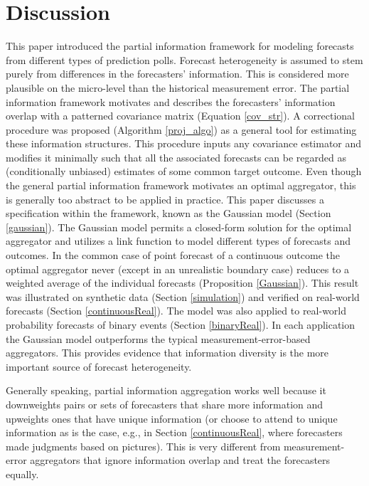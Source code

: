 \documentclass[11pt]{article}
\theoremstyle{definition}
\theoremstyle{definition}
\begin{document}
\section{Discussion}
\label{discussion}
This paper introduced the partial information framework for modeling forecasts from different types of  prediction polls. Forecast heterogeneity is assumed to stem purely from differences in the forecasters' information. This is considered more plausible on the micro-level than the historical measurement error. The partial information framework motivates and describes the forecasters' information overlap with a patterned covariance matrix (Equation \ref{cov_str}). A correctional procedure was proposed (Algorithm \ref{proj_algo}) as a general tool for estimating these information structures. This procedure inputs any covariance estimator and modifies it minimally such that all the associated forecasts can be regarded as (conditionally unbiased) estimates of some common target outcome. Even though the general partial information framework motivates an optimal aggregator, this is generally too abstract to be applied in practice. 
%
%
%
%
 This paper discusses a specification within the framework, known as the Gaussian model (Section \ref{gaussian}). 
  The Gaussian model permits a closed-form solution for the optimal aggregator and utilizes a  link function to model different types of forecasts and outcomes. In the common case of point forecast of a continuous outcome the optimal aggregator never (except in an unrealistic boundary case) reduces to a weighted average of the individual forecasts (Proposition \ref{Gaussian}). This result was  illustrated on synthetic data (Section \ref{simulation}) and verified on real-world forecasts (Section \ref{continuousReal}). The model was also applied to real-world probability forecasts of binary events (Section \ref{binaryReal}).  In each application the Gaussian model outperforms the typical measurement-error-based aggregators. This provides evidence that information diversity is the more important source of forecast heterogeneity. 

Generally speaking, partial information aggregation works well because it downweights pairs or sets of forecasters that share more information and
      upweights ones that have unique information (or choose to attend to unique information as is the case, e.g., in Section \ref{continuousReal}, where forecasters made judgments based on pictures). This is very different from measurement-error aggregators that ignore information overlap and treat the forecasters equally.
      
\end{document}
